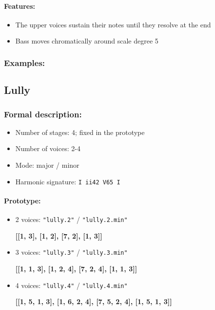 \documentclass[11pt, openany]{article}
\begin{document}
\paragraph{Features:}
\begin{itemize}
\item The upper voices sustain their notes until they resolve at the end
\item Bass moves chromatically around scale degree 5
\end{itemize}

\subsubsection{Examples:}


	\subsection{Lully}
	
\subsubsection{Formal description:}
\begin{itemize}
\item Number of stages: 4; fixed in the prototype
\item Number of voices: 2-4
\item Mode: major / minor
\item Harmonic signature: \texttt{I ii42 V65 I}
\end{itemize}

\paragraph{Prototype:}
\begin{itemize}
\item 2 voices: \texttt{"lully.2"} / \texttt{"lully.2.min"}
	\begin{center}
	\textbf{[[1, 3], [1, 2], [7, 2], [1, 3]]}
	\end{center}
\item 3 voices: \texttt{"lully.3"} / \texttt{"lully.3.min"}
	\begin{center}
	\textbf{[[1, 1, 3], [1, 2, 4], [7, 2, 4], [1, 1, 3]]}
	\end{center}
\item 4 voices: \texttt{"lully.4"} / \texttt{"lully.4.min"}
	\begin{center}
	\textbf{[[1, 5, 1, 3], [1, 6, 2, 4], [7, 5, 2, 4], [1, 5, 1, 3]]}
	\end{center}
\end{itemize}
\end{document}
